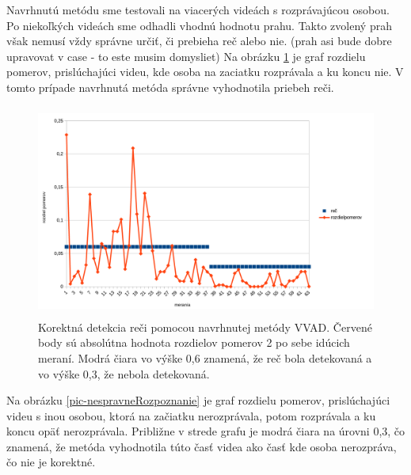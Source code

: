 Navrhnutú metódu sme testovali na viacerých videách s rozprávajúcou osobou.
Po niekoľkých videách sme odhadli vhodnú hodnotu prahu. 
Takto zvolený prah však nemusí vždy správne určiť, či prebieha reč alebo nie.
(prah asi bude dobre upravovat v case - to este musim domysliet)
Na obrázku \ref{pic-spravneRozpoznanie} je graf rozdielu pomerov, prislúchajúci videu, kde osoba na zaciatku rozprávala a ku koncu nie. 
V tomto prípade navrhnutá metóda správne vyhodnotila priebeh reči.

\begin{figure}[H]
	\begin{center}
		\includegraphics[height=7cm]{pics/spravneRozpoznanie.png}
		\caption{Korektná detekcia reči pomocou navrhnutej metódy VVAD.
		Červené body sú absolútna hodnota rozdielov pomerov 2 po sebe idúcich meraní. 
		Modrá čiara vo výške 0,6 znamená, že reč bola detekovaná a vo výške 0,3, že nebola detekovaná.}
		\label{pic-spravneRozpoznanie}
	\end{center}
\end{figure}

Na obrázku \ref{pic-nespravneRozpoznanie} je graf rozdielu pomerov, prislúchajúci videu s inou osobou, ktorá na začiatku nerozprávala, potom rozprávala a ku koncu opäť nerozprávala. 
Približne v strede grafu je modrá čiara na úrovni 0,3, čo znamená, že metóda vyhodnotila túto časť videa ako časť kde osoba nerozpráva, čo nie je korektné.

